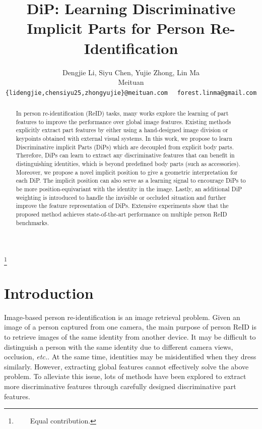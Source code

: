 \documentclass[10pt,twocolumn,letterpaper]{article}
\begin{document}
\title{DiP: Learning Discriminative Implicit Parts for Person Re-Identification}

\author{Dengjie Li, Siyu Chen, Yujie Zhong, Lin Ma\\
Meituan\\
{\tt\small \{lidengjie,chensiyu25,zhongyujie\}@meituan.com}~~
{\tt\small forest.linma@gmail.com}
}
\maketitle

\footnote{~~~~Equal contribution.}
\ificcvfinal\thispagestyle{empty}\fi


\vspace{-0.4cm}
\begin{abstract}

In person re-identification (ReID) tasks, many works explore the learning of part features to improve the performance over global image features. Existing methods explicitly extract part features by either using a hand-designed image division or keypoints obtained with external visual systems. In this work, we propose to learn Discriminative implicit Parts (DiPs) which are decoupled from explicit body parts. Therefore, DiPs can learn to extract any discriminative features that can benefit in distinguishing identities, which is beyond predefined body parts (such as accessories). Moreover, we propose a novel implicit position to give a geometric interpretation for each DiP. The implicit position can also serve as a learning signal to encourage DiPs to be more position-equivariant with the identity in the image. 
Lastly, an additional DiP weighting is introduced to handle the invisible or occluded situation and further improve the feature representation of DiPs.
Extensive experiments show that the proposed method achieves state-of-the-art performance on multiple person ReID benchmarks.
\end{abstract}

\vspace{-0.2cm}
\section{Introduction}
\label{sec:intro}

Image-based person re-identification is an image retrieval problem. Given an image of a person captured from one camera, the main purpose of person ReID is to retrieve images of the same identity from another device. It may be difficult to distinguish a person with the same identity due to different camera views, occlusion, \textit{etc.}. At the same time, identities may be misidentified when they dress similarly. However, extracting global features cannot effectively solve the above problem. To alleviate this issue, lots of methods have been explored to extract more discriminative features through carefully designed discriminative part features. 
\end{document}

